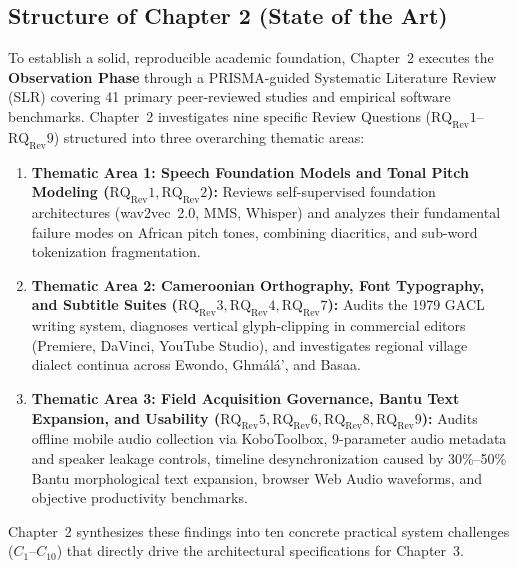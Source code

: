 \documentclass[a4paper,11pt]{article}
\begin{document}
\subsection{Structure of Chapter 2 (State of the Art)}
\label{sec:chap1_structure_chapter2}

To establish a solid, reproducible academic foundation, Chapter~2 executes the \textbf{Observation Phase} through a PRISMA-guided Systematic Literature Review (SLR) covering 41 primary peer-reviewed studies and empirical software benchmarks. Chapter~2 investigates nine specific Review Questions ($\text{RQ}_{\text{Rev}}1$--$\text{RQ}_{\text{Rev}}9$) structured into three overarching thematic areas:
\begin{enumerate}
    \item \textbf{Thematic Area 1: Speech Foundation Models and Tonal Pitch Modeling ($\text{RQ}_{\text{Rev}}1, \text{RQ}_{\text{Rev}}2$):} Reviews self-supervised foundation architectures (wav2vec~2.0, MMS, Whisper) and analyzes their fundamental failure modes on African pitch tones, combining diacritics, and sub-word tokenization fragmentation.
    \item \textbf{Thematic Area 2: Cameroonian Orthography, Font Typography, and Subtitle Suites ($\text{RQ}_{\text{Rev}}3, \text{RQ}_{\text{Rev}}4, \text{RQ}_{\text{Rev}}7$):} Audits the 1979 GACL writing system, diagnoses vertical glyph-clipping in commercial editors (Premiere, DaVinci, YouTube Studio), and investigates regional village dialect continua across Ewondo, Gh\textopeno m\'al\'a', and Basaa.
    \item \textbf{Thematic Area 3: Field Acquisition Governance, Bantu Text Expansion, and Usability ($\text{RQ}_{\text{Rev}}5, \text{RQ}_{\text{Rev}}6, \text{RQ}_{\text{Rev}}8, \text{RQ}_{\text{Rev}}9$):} Audits offline mobile audio collection via KoboToolbox, 9-parameter audio metadata and speaker leakage controls, timeline desynchronization caused by 30\%--50\% Bantu morphological text expansion, browser Web Audio waveforms, and objective productivity benchmarks.
\end{enumerate}
Chapter~2 synthesizes these findings into ten concrete practical system challenges ($C_1$--$C_{10}$) that directly drive the architectural specifications for Chapter~3.

\newpage
\appendix
\nocite{*}
\printbibliography[heading=bibintoc]
\end{document}
